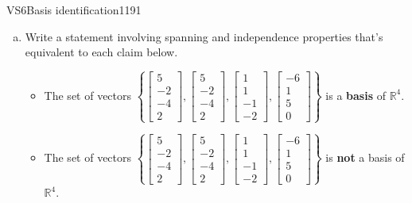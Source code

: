\begin{exercise}{VS6}{Basis identification}{1191} 
\begin{exerciseStatement} 

\begin{enumerate}[(a)]
\item  

 Write a statement involving spanning and independence properties that's equivalent to each claim below. 

 

\begin{itemize}
\item  

 The set of vectors \(\left\{ \left[\begin{array}{c}
5 \\
-2 \\
-4 \\
2
\end{array}\right] , \left[\begin{array}{c}
5 \\
-2 \\
-4 \\
2
\end{array}\right] , \left[\begin{array}{c}
1 \\
1 \\
-1 \\
-2
\end{array}\right] , \left[\begin{array}{c}
-6 \\
1 \\
5 \\
0
\end{array}\right] \right\}\) is a \textbf{basis} of \(\mathbb{R}^4\). 

 
\item  

 The set of vectors \(\left\{ \left[\begin{array}{c}
5 \\
-2 \\
-4 \\
2
\end{array}\right] , \left[\begin{array}{c}
5 \\
-2 \\
-4 \\
2
\end{array}\right] , \left[\begin{array}{c}
1 \\
1 \\
-1 \\
-2
\end{array}\right] , \left[\begin{array}{c}
-6 \\
1 \\
5 \\
0
\end{array}\right] \right\}\) is \textbf{not} a basis of \(\mathbb{R}^4\). 


\end{itemize}
\end{enumerate}
\end{exerciseStatement}
\end{exercise}
